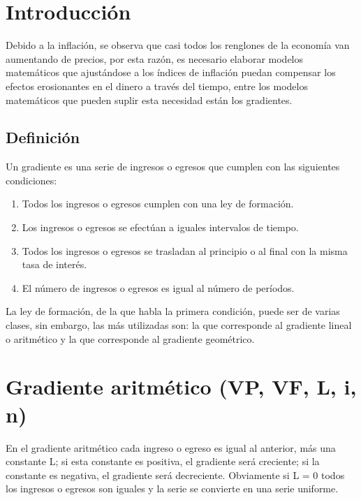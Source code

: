 \section{Introducción}


Debido a la inflación, se observa que casi todos los renglones de la economía van aumentando de precios, por esta razón, es necesario elaborar modelos matemáticos que ajustándose a los índices de inflación puedan compensar los efectos erosionantes en el dinero a través del tiempo, entre los modelos matemáticos que pueden suplir esta necesidad están los gradientes.\\

\subsection{Definición}

Un gradiente es una serie de ingresos o egresos que cumplen con las siguientes condiciones:\\
\begin{enumerate}
	\item Todos los ingresos o egresos cumplen con una ley de formación.
	\item Los ingresos o egresos se efectúan a iguales intervalos de tiempo.
	\item Todos los ingresos o egresos se trasladan al principio o al final con la misma tasa de interés.
	\item El número de ingresos o egresos es igual al número de períodos.\\
\end{enumerate}

La ley de formación, de la que habla la primera condición, puede ser de varias clases, sin embargo, las más utilizadas son: la que corresponde al gradiente lineal o aritmético y la que corresponde al gradiente geométrico.\\

\section{Gradiente aritmético (VP, VF, L, i, n)}

En el gradiente aritmético cada ingreso o egreso es igual al anterior, más una constante L; si esta constante es positiva, el gradiente será creciente; si la constante es negativa, el gradiente será decreciente. Obviamente si L = 0 todos los ingresos o egresos son iguales y la serie se convierte en una serie uniforme. \\


